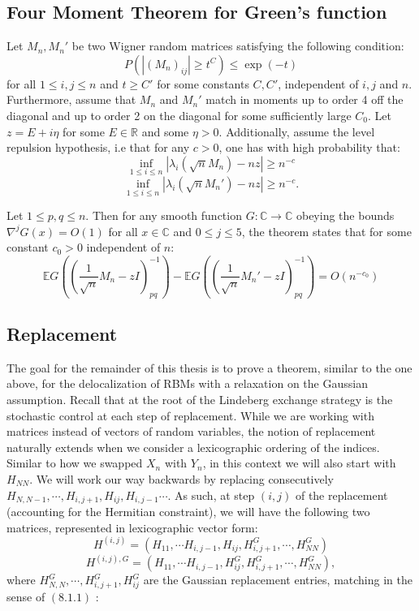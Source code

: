 \documentclass[11pt]{article}
\begin{document}
\subsection*{Four Moment Theorem for Green's function}
Let $M_n, M_n'$ be two Wigner random matrices satisfying the following condition: $$P(|(M_n)_{ij}|\geq t^C)\leq \exp(-t)$$
for all $1\leq i, j\leq n$ and $t\geq C'$ for some constants $C, C'$, independent of $i, j$ and $n$. Furthermore, assume that $M_n$ and $M_n'$ match in moments up to order 4 off the diagonal and up to order 2 on the diagonal for some sufficiently large $C_0$. Let $z = E + i\eta$ for some $E \in \mathbb{R}$ and some $\eta > 0$. Additionally, assume the level repulsion hypothesis, i.e that for any $c > 0$, one has with high probability that:
\begin{equation*}
    \inf_{1 \leq i \leq n} |\lambda_i(\sqrt{n}M_n) - nz| \geq n^{-c}
\end{equation*}
\begin{equation*}
    \inf_{1 \leq i \leq n} |\lambda_i(\sqrt{n}M_n') - nz| \geq n^{-c}.
\end{equation*}

\noindent Let $1 \leq p,q \leq n$. Then for any smooth function $G: \mathbb{C} \to \mathbb{C}$ obeying the bounds $\nabla^j G(x) = O(1)$ for all $x \in \mathbb{C}$ and $0 \leq j \leq 5$, the theorem states that for some constant $c_0 > 0$ independent of $n$:
\begin{equation*}
    \mathbb{E} G \left( \left( \frac{1}{\sqrt{n}} M_n - zI \right)^{-1}_{pq} \right)
    - \mathbb{E} G \left( \left( \frac{1}{\sqrt{n}} M_n' - zI \right)^{-1}_{pq} \right)
    = O(n^{-c_0})
\end{equation*}



\subsection{Replacement}
The goal for the remainder of this thesis is to prove a theorem, similar to the one above, for the delocalization of RBMs with a relaxation on the Gaussian assumption. Recall that at the root of the Lindeberg exchange strategy is the stochastic control at each step of replacement. While we are working with matrices instead of vectors of random variables, the notion of replacement naturally extends when we consider a lexicographic ordering of the indices. Similar to how we swapped $X_n$ with $Y_n$, in this context we will also start with $H_{NN}$. We will work our way backwards by replacing consecutively $H_{N, N-1}, \cdots,H_{i, j+1},  H_{ij}, H_{i, j-1}\cdots$.  As such, at step $(i, j)$ of the replacement (accounting for the Hermitian constraint), we will have the following two matrices, represented in lexicographic vector form:
$$H^{(i, j)}=(H_{11}, \cdots H_{i, j-1}, H_{ij}, H_{i, j+1}^G, \cdots, H_{NN}^G)$$
$$H^{(i, j), G}=(H_{11}, \cdots H_{i, j-1}, H_{ij}^G, H_{i, j+1}^G, \cdots, H_{NN}^G),$$
where $H_{N, N}^G, \cdots, H_{i, j+1}^G,  H_{ij}^G$ are the Gaussian replacement entries, matching in the sense of $(8.1.1)$ :
\end{document}
